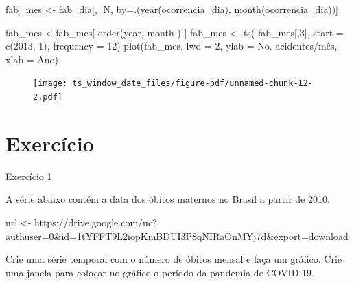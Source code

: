 \documentclass[
  letterpaper,
  DIV=11,
  numbers=noendperiod]{scrartcl}
\newenvironment{Shaded}{\begin{snugshade}}{\end{snugshade}}
\newcommand{\AttributeTok}[1]{\textcolor[rgb]{0.40,0.45,0.13}{#1}}
\newcommand{\DecValTok}[1]{\textcolor[rgb]{0.68,0.00,0.00}{#1}}
\newcommand{\FunctionTok}[1]{\textcolor[rgb]{0.28,0.35,0.67}{#1}}
\newcommand{\NormalTok}[1]{\textcolor[rgb]{0.00,0.23,0.31}{#1}}
\newcommand{\OtherTok}[1]{\textcolor[rgb]{0.00,0.23,0.31}{#1}}
\newcommand{\StringTok}[1]{\textcolor[rgb]{0.13,0.47,0.30}{#1}}
\theoremstyle{plain}
\theoremstyle{plain}
\theoremstyle{definition}
\theoremstyle{definition}
\theoremstyle{remark}
\begin{document}
\begin{Shaded}
\begin{Highlighting}[]
\NormalTok{fab\_mes }\OtherTok{\textless{}{-}}\NormalTok{ fab\_dia[, .N, by}\OtherTok{=}\NormalTok{.(}\FunctionTok{year}\NormalTok{(ocorrencia\_dia), }\FunctionTok{month}\NormalTok{(ocorrencia\_dia))]}

\NormalTok{fab\_mes }\OtherTok{\textless{}{-}}\NormalTok{fab\_mes[ }\FunctionTok{order}\NormalTok{(year, month ) ]}
\NormalTok{fab\_mes }\OtherTok{\textless{}{-}} \FunctionTok{ts}\NormalTok{( fab\_mes[,}\DecValTok{3}\NormalTok{], }\AttributeTok{start =} \FunctionTok{c}\NormalTok{(}\DecValTok{2013}\NormalTok{, }\DecValTok{1}\NormalTok{), }\AttributeTok{frequency =} \DecValTok{12}\NormalTok{)}
\FunctionTok{plot}\NormalTok{(fab\_mes, }\AttributeTok{lwd =} \DecValTok{2}\NormalTok{, }\AttributeTok{ylab =} \StringTok{\textquotesingle{}No. acidentes/mês\textquotesingle{}}\NormalTok{, }\AttributeTok{xlab =} \StringTok{\textquotesingle{}Ano\textquotesingle{}}\NormalTok{)}
\end{Highlighting}
\end{Shaded}

\begin{figure}[H]

{\centering \texttt{[image: ts\_window\_date\_files/figure-pdf/unnamed-chunk-12-2.pdf]}

}

\end{figure}

\hypertarget{exercuxedcio}{%
\section{Exercício}\label{exercuxedcio}}

Exercício 1

A série abaixo contém a data dos óbitos maternos no Brasil a partir de
2010.

\begin{Shaded}
\begin{Highlighting}[]
\NormalTok{url }\OtherTok{\textless{}{-}} \StringTok{\textquotesingle{}https://drive.google.com/uc?authuser=0\&id=1tYFFT9L2iopKmBDUI3P8qNIRaOnMYj7d\&export=download\textquotesingle{}}
\end{Highlighting}
\end{Shaded}

Crie uma série temporal com o número de óbitos mensal e faça um gráfico.
Crie uma janela para colocar no gráfico o período da pandemia de
COVID-19.
\end{document}

